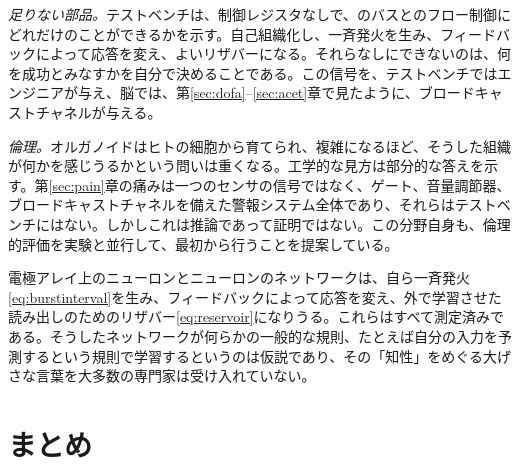 \emph{足りない部品。}テストベンチは、制御レジスタなしで、のバスとのフロー制御にどれだけのことができるかを示す。自己組織化し、一斉発火を生み、フィードバックによって応答を変え、よいリザバーになる。それらなしにできないのは、何を成功とみなすかを自分で決めることである。この信号を、テストベンチではエンジニアが与え、脳では、第\ref{sec:dofa}--\ref{sec:acet}章で見たように、ブロードキャストチャネルが与える。

\emph{倫理。}オルガノイドはヒトの細胞から育てられ、複雑になるほど、そうした組織が何かを感じうるかという問いは重くなる。工学的な見方は部分的な答えを示す。第\ref{sec:pain}章の痛みは一つのセンサの信号ではなく、ゲート、音量調節器、ブロードキャストチャネルを備えた警報システム全体であり、それらはテストベンチにはない。しかしこれは推論であって証明ではない。この分野自身も、倫理的評価を実験と並行して、最初から行うことを提案している\cite{Smirnova2023}。

\begin{keyblock}
\begin{proposition}[テストベンチ上の生きたネットワーク]
\label{prop:livingmachine}
電極アレイ上のニューロンとニューロンのネットワークは、自ら一斉発火\eqref{eq:burstinterval}を生み、フィードバックによって応答を変え、外で学習させた読み出しのためのリザバー\eqref{eq:reservoir}になりうる。これらはすべて測定済みである。そうしたネットワークが何らかの一般的な規則、たとえば自分の入力を予測するという規則で学習するというのは仮説であり、その「知性」をめぐる大げさな言葉を大多数の専門家は受け入れていない。
\end{proposition}
\end{keyblock}



\section{まとめ}

